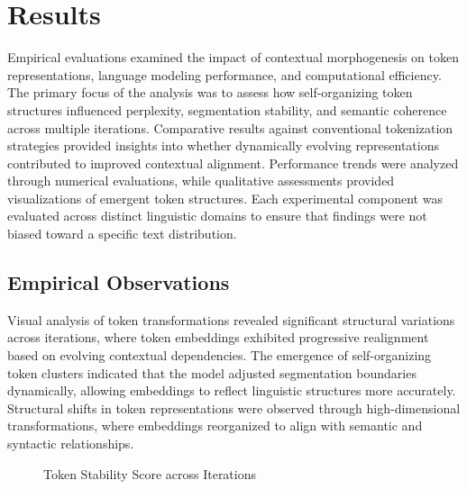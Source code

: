 \documentclass{article}
\begin{document}
\section{Results}

Empirical evaluations examined the impact of contextual morphogenesis on token representations, language modeling performance, and computational efficiency. The primary focus of the analysis was to assess how self-organizing token structures influenced perplexity, segmentation stability, and semantic coherence across multiple iterations. Comparative results against conventional tokenization strategies provided insights into whether dynamically evolving representations contributed to improved contextual alignment. Performance trends were analyzed through numerical evaluations, while qualitative assessments provided visualizations of emergent token structures. Each experimental component was evaluated across distinct linguistic domains to ensure that findings were not biased toward a specific text distribution.

\subsection{Empirical Observations}

Visual analysis of token transformations revealed significant structural variations across iterations, where token embeddings exhibited progressive realignment based on evolving contextual dependencies. The emergence of self-organizing token clusters indicated that the model adjusted segmentation boundaries dynamically, allowing embeddings to reflect linguistic structures more accurately. Structural shifts in token representations were observed through high-dimensional transformations, where embeddings reorganized to align with semantic and syntactic relationships.

\begin{figure}[t]
	\centering
	\caption{Token Stability Score across Iterations}
	\label{fig:token_stability}
\end{figure}
\end{document}

